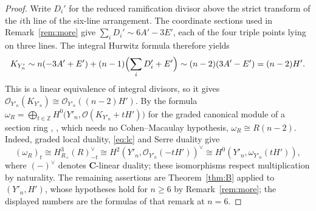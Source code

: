 \documentclass[11pt]{amsart}
\theoremstyle{remark}
\theoremstyle{definition}
\newcommand{\ZZ}{\mathbb{Z}}
\newcommand{\CC}{\mathbf{C}}
\newcommand{\cO}{\mathcal{O}}
\begin{document}
\begin{proof}
Write $D_i'$ for the reduced ramification divisor above the strict transform of the $i$th line of the six-line arrangement. The coordinate sections used in Remark~\ref{rem:more} give $\sum_iD_i'\sim6A'-3E'$, each of the four triple points lying on three lines. The integral Hurwitz formula therefore yields
\[
K_{Y'_n}\sim n(-3A'+E')+(n-1)\Bigl(\sum_iD_i'+E'\Bigr)
\sim(n-2)(3A'-E')=(n-2)H'.
\]
This is a linear equivalence of integral divisors, so it gives $\cO_{Y'_n}(K_{Y'_n})\cong\cO_{Y'_n}((n-2)H')$. By the formula $\omega_R=\bigoplus_{t\in\ZZ}H^0\bigl(Y'_n,\cO(K_{Y'_n}+tH')\bigr)$ for the graded canonical module of a section ring \cite[(5.1.8)]{GoWa}, \cite{Wa}, which needs no Cohen--Macaulay hypothesis, $\omega_R\cong R(n-2)$. Indeed, graded local duality, \eqref{eq:lc} and Serre duality give
\[
(\omega_R)_t\cong H^3_{R_+}(R)_{-t}^{\vee}
\cong H^2(Y'_n,\cO_{Y'_n}(-tH'))^{\vee}
\cong H^0(Y'_n,\omega_{Y'_n}(tH')),
\]
where $(-)^{\vee}$ denotes $\CC$-linear duality; these isomorphisms respect multiplication by naturality. The remaining assertions are Theorem~\ref{thm:B} applied to $(Y'_n,H')$, whose hypotheses hold for $n\ge6$ by Remark~\ref{rem:more}; the displayed numbers are the formulas of that remark at $n=6$.
\end{proof}
\end{document}
